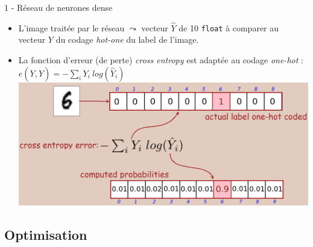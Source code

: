 \documentclass[10pt,serif,mathserif,compress,hyperref={colorlinks}]{beamer}
\begin{document}
\begin{frame}{1 - Réseau de neurones dense}

  \begin{tcolorbox}[title=Fonction d'erreur : {\em Cross entropy error}]  

    \begin{itemize}
    \item L'image traitée par le réseau $\leadsto$ vecteur $\hat{Y}$ de 10 \texttt{float} à comparer au vecteur $Y$ du codage {\em hot-one} du label de l'image.
    \item La fonction d'erreur (de perte) {\em cross entropy} est adaptée au codage {\em one-hot} : $e(Y,\hat{Y})=-\sum_i Y_i\ log(\hat{Y}_i)$\\
      \includegraphics[width=.9\textwidth]{images/CrossEntropyError.png}
    \end{itemize}

  \end{tcolorbox}
  
\end{frame}

\subsection{Optimisation}
\end{document}
